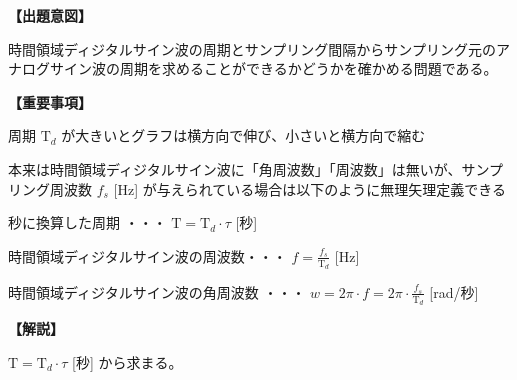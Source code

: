 \noindent \textbf{【出題意図】}

\bigskip
\noindent 時間領域ディジタルサイン波の周期とサンプリング間隔からサンプリング元のアナログサイン波の周期を求めることができるかどうかを確かめる問題である。

\vspace{1em}
\noindent \textbf{【重要事項】}

\bigskip
\noindent 周期 $\textrm{T}_d$ が大きいとグラフは横方向で伸び、小さいと横方向で縮む

\bigskip
\noindent 本来は時間領域ディジタルサイン波に「角周波数」「周波数」は無いが、サンプリング周波数 $f_s$ [Hz] が与えられている場合は以下のように無理矢理定義できる

\bigskip
\noindent 秒に換算した周期 ・・・ $\textrm{T} = \textrm{T}_d \cdot \tau$ [秒]

\bigskip
\noindent 時間領域ディジタルサイン波の周波数・・・ $f = \frac{f_s}{\textrm{T}_d}$ [Hz]

\bigskip
\noindent 時間領域ディジタルサイン波の角周波数 ・・・ $w = 2\pi \cdot f = 2 \pi \cdot \frac{f_s}{\textrm{T}_d}$ [rad/秒]

\bigskip

\vspace{1em}
\noindent \textbf{【解説】}

\bigskip
\noindent $\textrm{T} = \textrm{T}_d \cdot \tau$ [秒] から求まる。
